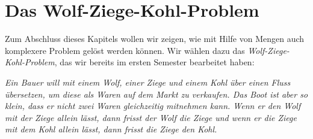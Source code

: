 \section{Das Wolf-Ziege-Kohl-Problem}
Zum Abschluss dieses Kapitels wollen wir zeigen, wie mit Hilfe von Mengen auch komplexere
Problem gel\"ost werden k\"onnen.  Wir w\"ahlen dazu das \emph{Wolf-Ziege-Kohl-Problem}, das wir
bereits im ersten Semester  bearbeitet haben:
\vspace*{0.3cm}

\begin{minipage}[c]{14cm}
{\sl
Ein Bauer will mit einem Wolf, einer Ziege und einem Kohl \"uber einen Fluss \"ubersetzen, um
diese als Waren auf dem Markt zu verkaufen.
Das Boot ist aber so klein, dass er nicht zwei Waren gleichzeitig mitnehmen kann.
Wenn er den Wolf mit der Ziege allein l\"asst, dann frisst der Wolf die Ziege und wenn er die
Ziege mit dem Kohl allein l\"asst, dann frisst die Ziege den Kohl. }
\end{minipage}
\vspace*{0.3cm}


